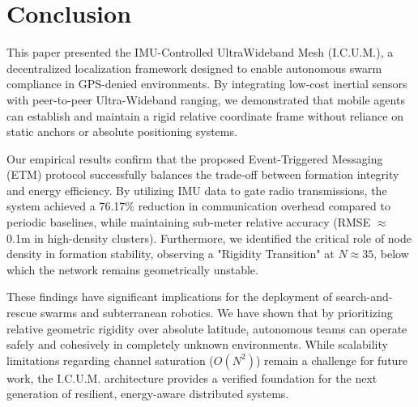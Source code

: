 \section{Conclusion}

\noindent This paper presented the IMU-Controlled UltraWideband Mesh (I.C.U.M.), a decentralized localization framework designed to enable autonomous swarm compliance in GPS-denied environments. By integrating low-cost inertial sensors with peer-to-peer Ultra-Wideband ranging, we demonstrated that mobile agents can establish and maintain a rigid relative coordinate frame without reliance on static anchors or absolute positioning systems.

\noindent Our empirical results confirm that the proposed Event-Triggered Messaging (ETM) protocol successfully balances the trade-off between formation integrity and energy efficiency. By utilizing IMU data to gate radio transmissions, the system achieved a 76.17\% reduction in communication overhead compared to periodic baselines, while maintaining sub-meter relative accuracy (RMSE $\approx$ 0.1m in high-density clusters). Furthermore, we identified the critical role of node density in formation stability, observing a "Rigidity Transition" at $N \approx 35$, below which the network remains geometrically unstable.

\noindent These findings have significant implications for the deployment of search-and-rescue swarms and subterranean robotics. We have shown that by prioritizing relative geometric rigidity over absolute latitude, autonomous teams can operate safely and cohesively in completely unknown environments. While scalability limitations regarding channel saturation ($O(N^2)$) remain a challenge for future work, the I.C.U.M. architecture provides a verified foundation for the next generation of resilient, energy-aware distributed systems.
